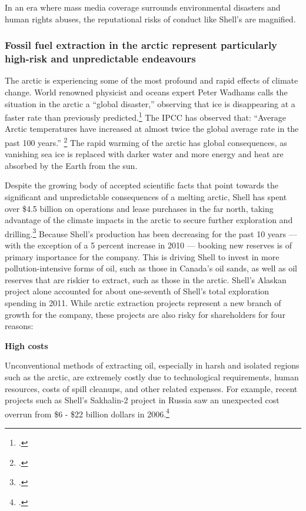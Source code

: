In an era where mass media coverage surrounds environmental disasters and human rights abuses, the reputational risks of conduct like Shell's are magnified.



	\subsubsection{Fossil fuel extraction in the arctic represent particularly high-risk and unpredictable endeavours}



The arctic is experiencing some of the most profound and rapid effects of climate change.
World renowned physicist and oceans expert Peter Wadhams calls the situation in the arctic a ``global disaster,'' observing that ice is disappearing at a faster rate than previously predicted.\footcite{Wadhams2012}
The IPCC has observed that: ``Average Arctic temperatures have increased at almost twice the global average rate in the past 100 years.'' \footcite[][Climate Change 2007: Synthesis Report - Observed changes in climate and their effects]{IPCC2007}
The rapid warming of the arctic has global consequences, as vanishing sea ice is replaced with darker water and more energy and heat are absorbed by the Earth from the sun.


Despite the growing body of accepted scientific facts that point towards the significant and unpredictable consequences of a melting arctic, Shell has spent over \$4.5 billion on operations and lease purchases in the far north, taking advantage of the climate impacts in the arctic to secure further exploration and drilling.\footcite{ShellSuspends}
Because Shell's production has been decreasing for the past 10 years --- with the exception of a 5 percent increase in 2010  --- booking new reserves is of primary importance for the company.
This is driving Shell to invest in more pollution-intensive forms of oil, such as those in Canada's oil sands, as well as oil reserves that are riskier to extract, such as those in the arctic.
Shell's Alaskan project alone accounted for about one-seventh of Shell's total exploration spending in 2011. 
While arctic extraction projects represent a new branch of growth for the company, these projects are also risky for shareholders for four reasons:



\textbf{High costs} 



Unconventional methods of extracting oil, especially in harsh and isolated regions such as the arctic, are extremely costly due to technological requirements, human resources, costs of spill cleanups, and other related expenses. 
For example, recent projects such as Shell's Sakhalin-2 project in Russia saw an unexpected cost overrun from \$6 - \$22 billion dollars in 2006.\footcite[For more on these four central risk factors see: ][]{OutInTheCold_2012}



